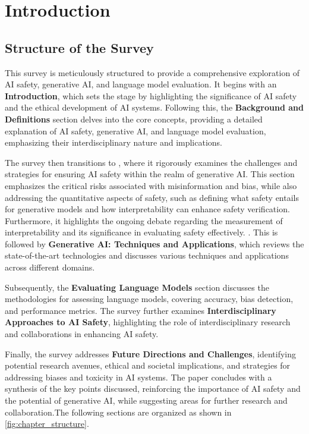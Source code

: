 \section{Introduction} \label{sec:Introduction}


\subsection{Structure of the Survey} \label{subsec:Structure of the Survey}

This survey is meticulously structured to provide a comprehensive exploration of AI safety, generative AI, and language model evaluation. It begins with an \textbf{Introduction}, which sets the stage by highlighting the significance of AI safety and the ethical development of AI systems. Following this, the \textbf{Background and Definitions} section delves into the core concepts, providing a detailed explanation of AI safety, generative AI, and language model evaluation, emphasizing their interdisciplinary nature and implications.



The survey then transitions to , where it rigorously examines the challenges and strategies for ensuring AI safety within the realm of generative AI. This section emphasizes the critical risks associated with misinformation and bias, while also addressing the quantitative aspects of safety, such as defining what safety entails for generative models and how interpretability can enhance safety verification. Furthermore, it highlights the ongoing debate regarding the measurement of interpretability and its significance in evaluating safety effectively. \cite{wei2022safetyinterpretablemachinelearning}. This is followed by \textbf{Generative AI: Techniques and Applications}, which reviews the state-of-the-art technologies and discusses various techniques and applications across different domains.



Subsequently, the \textbf{Evaluating Language Models} section discusses the methodologies for assessing language models, covering accuracy, bias detection, and performance metrics. The survey further examines \textbf{Interdisciplinary Approaches to AI Safety}, highlighting the role of interdisciplinary research and collaborations in enhancing AI safety.



Finally, the survey addresses \textbf{Future Directions and Challenges}, identifying potential research avenues, ethical and societal implications, and strategies for addressing biases and toxicity in AI systems. The paper concludes with a synthesis of the key points discussed, reinforcing the importance of AI safety and the potential of generative AI, while suggesting areas for further research and collaboration.The following sections are organized as shown in \autoref{fig:chapter_structure}.








